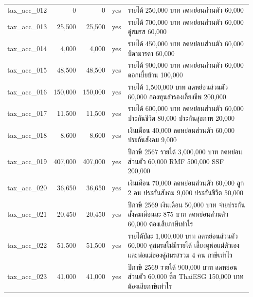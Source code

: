 \documentclass[11pt,a4paper]{article}
\begin{document}
{\begin{longtable}{lrrlp{8.6cm}}
tax\_\allowbreak{}acc\_\allowbreak{}012 & 0 & 0 & yes & {\thaifont รายได้ }250,000 {\thaifont บาท ลดหย่อนส่วนตัว }60,000 \\
tax\_\allowbreak{}acc\_\allowbreak{}013 & 25,500 & 25,500 & yes & {\thaifont รายได้ }700,000 {\thaifont บาท ลดหย่อนส่วนตัว }60,000 {\thaifont คู่สมรส }60,000 \\
tax\_\allowbreak{}acc\_\allowbreak{}014 & 4,000 & 4,000 & yes & {\thaifont รายได้ }450,000 {\thaifont บาท ลดหย่อนส่วนตัว }60,000 {\thaifont บิดามารดา }60,000 \\
tax\_\allowbreak{}acc\_\allowbreak{}015 & 48,500 & 48,500 & yes & {\thaifont รายได้ }900,000 {\thaifont บาท ลดหย่อนส่วนตัว }60,000 {\thaifont ดอกเบี้ยบ้าน }100,000 \\
tax\_\allowbreak{}acc\_\allowbreak{}016 & 150,000 & 150,000 & yes & {\thaifont รายได้ }1,500,000 {\thaifont บาท ลดหย่อนส่วนตัว }60,000 {\thaifont กองทุนสำรองเลี้ยงชีพ }200,000 \\
tax\_\allowbreak{}acc\_\allowbreak{}017 & 11,500 & 11,500 & yes & {\thaifont รายได้ }600,000 {\thaifont บาท ลดหย่อนส่วนตัว }60,000 {\thaifont ประกันชีวิต }80,000 {\thaifont ประกันสุขภาพ }20,000 \\
tax\_\allowbreak{}acc\_\allowbreak{}018 & 8,600 & 8,600 & yes & {\thaifont เงินเดือน }40,000 {\thaifont ลดหย่อนส่วนตัว }60,000 {\thaifont ประกันสังคม }9,000 \\
tax\_\allowbreak{}acc\_\allowbreak{}019 & 407,000 & 407,000 & yes & {\thaifont ปีภาษี }2567 {\thaifont รายได้ }3,000,000 {\thaifont บาท ลดหย่อนส่วนตัว }60,000 RMF 500,000 SSF 200,000 \\
tax\_\allowbreak{}acc\_\allowbreak{}020 & 36,650 & 36,650 & yes & {\thaifont เงินเดือน }70,000 {\thaifont ลดหย่อนส่วนตัว }60,000 {\thaifont ลูก }2 {\thaifont คน ประกันสังคม }9,000 {\thaifont ประกันชีวิต }50,000 \\
tax\_\allowbreak{}acc\_\allowbreak{}021 & 20,450 & 20,450 & yes & {\thaifont ปีภาษี }2569 {\thaifont เงินเดือน }50,000 {\thaifont บาท จ่ายประกันสังคมเดือนละ }875 {\thaifont บาท ลดหย่อนส่วนตัว }60,000 {\thaifont ต้องเสียภาษีเท่าไร} \\
tax\_\allowbreak{}acc\_\allowbreak{}022 & 51,500 & 51,500 & yes & {\thaifont รายได้ปีละ }1,000,000 {\thaifont บาท ลดหย่อนส่วนตัว }60,000 {\thaifont คู่สมรสไม่มีรายได้ เลี้ยงดูพ่อแม่ตัวเองและพ่อแม่ของคู่สมรสรวม }4 {\thaifont คน ภาษีเท่าไร} \\
tax\_\allowbreak{}acc\_\allowbreak{}023 & 41,000 & 41,000 & yes & {\thaifont ปีภาษี }2569 {\thaifont รายได้ }900,000 {\thaifont บาท ลดหย่อนส่วนตัว }60,000 {\thaifont ซื้อ }ThaiESG 150,000 {\thaifont บาท ต้องเสียภาษีเท่าไร} \\

\end{longtable}}
\end{document}
